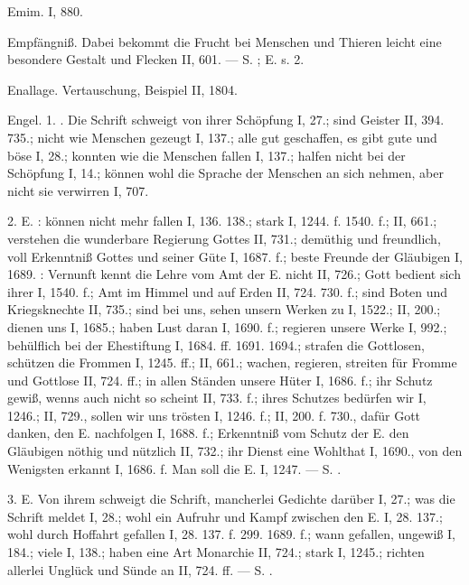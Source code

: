 Emim. I, 880.

Empfängniß. Dabei bekommt die Frucht bei Menschen und Thieren leicht eine besondere Gestalt und Flecken II, 601. — S. ; E.  s.  2.

Enallage. Vertauschung, Beispiel II, 1804.

Engel. 1. . Die Schrift schweigt von ihrer Schöpfung I, 27.; sind Geister II, 394. 735.; nicht wie Menschen gezeugt I, 137.; alle gut geschaffen, es gibt gute und böse I, 28.; konnten wie die Menschen fallen I, 137.; halfen nicht bei der Schöpfung I, 14.; können wohl die Sprache der Menschen an sich nehmen, aber nicht sie verwirren I, 707.

2.  E. : können nicht mehr fallen I, 136. 138.; stark I, 1244. f. 1540. f.; II, 661.; verstehen die wunderbare Regierung Gottes II, 731.; demüthig und freundlich, voll Erkenntniß Gottes und seiner Güte I, 1687. f.; beste Freunde der Gläubigen I, 1689. : Vernunft kennt die Lehre vom Amt der E. nicht II, 726.; Gott bedient sich ihrer I, 1540. f.; Amt im Himmel und auf Erden II, 724. 730. f.; sind Boten und Kriegsknechte II, 735.; sind bei uns, sehen unsern Werken zu I, 1522.; II, 200.; dienen uns I, 1685.; haben Lust daran I, 1690. f.; regieren unsere Werke I, 992.; behülflich bei der Ehestiftung I, 1684. ff. 1691. 1694.; strafen die Gottlosen, schützen die Frommen I, 1245. ff.; II, 661.; wachen, regieren, streiten für Fromme und Gottlose II, 724. ff.; in allen Ständen unsere Hüter I, 1686. f.; ihr Schutz gewiß, wenns auch nicht so scheint II, 733. f.; ihres Schutzes bedürfen wir I, 1246.; II, 729., sollen wir uns trösten I, 1246. f.; II, 200. f. 730., dafür Gott danken, den E. nachfolgen I, 1688. f.; Erkenntniß vom Schutz der E. den Gläubigen nöthig und nützlich II, 732.; ihr Dienst eine Wohlthat I, 1690., von den Wenigsten erkannt I, 1686. f. Man soll die E.  I, 1247. — S. .

3.  E. Von ihrem  schweigt die Schrift, mancherlei Gedichte darüber I, 27.; was die Schrift meldet I, 28.; wohl ein Aufruhr und Kampf zwischen den E. I, 28. 137.; wohl durch Hoffahrt gefallen I, 28. 137. f. 299. 1689. f.; wann gefallen, ungewiß I, 184.; viele I, 138.; haben eine Art Monarchie II, 724.; stark I, 1245.; richten allerlei Unglück und Sünde an II, 724. ff. — S. .

